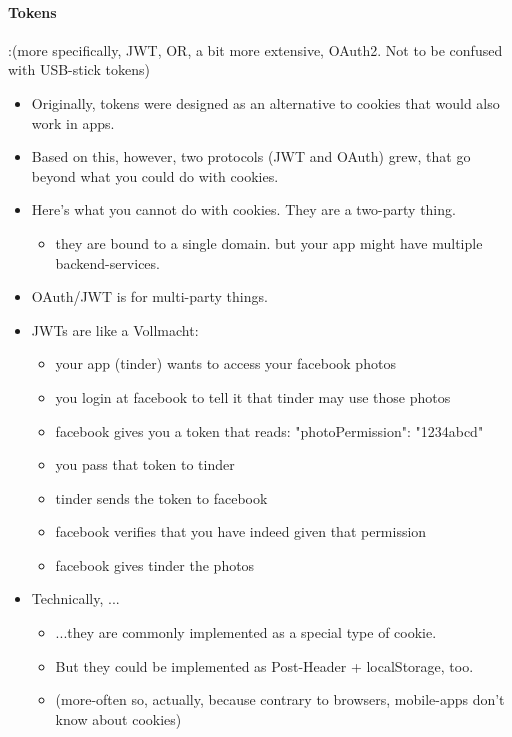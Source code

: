 \paragraph{Tokens}:(more specifically, JWT, OR, a bit more extensive, OAuth2. Not to be confused with USB-stick tokens)
\begin{itemize}
     \item Originally, tokens were designed as an alternative to cookies that would also work in apps.
     \item Based on this, however, two protocols (JWT and OAuth) grew, that go beyond what you could do with cookies. 
     \item Here's what you cannot do with cookies. They are a two-party thing. \begin{itemize}
          \item  they are bound to a single domain. but your app might have multiple backend-services.
     \end{itemize}
     \item OAuth/JWT is for multi-party things.
     \item JWTs are like a Vollmacht: \begin{itemize}
          \item your app (tinder) wants to access your facebook photos
          \item you login at facebook to tell it that tinder may use those photos
          \item facebook gives you a token that reads: {"photoPermission": "1234abcd"}
          \item you pass that token to tinder
          \item tinder sends the token to facebook
          \item facebook verifies that you have indeed given that permission
          \item facebook gives tinder the photos
     \end{itemize}
     \item Technically, ... \begin{itemize}
          \item ...they are commonly implemented as a special type of cookie.
          \item But they could be implemented as Post-Header + localStorage, too. 
          \item (more-often so, actually, because contrary to browsers, mobile-apps don't know about cookies)
     \end{itemize}

\end{itemize}
